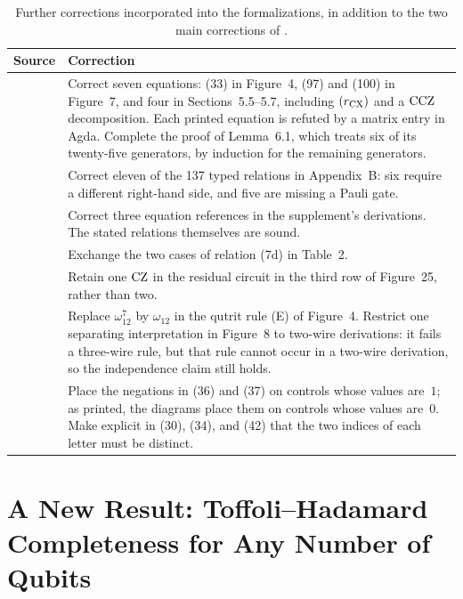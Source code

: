 \documentclass[acmsmall,screen,nonacm]{acmart}
\begin{document}
\begin{table}[!htbp]
\small
\setlength{\tabcolsep}{4pt}
\renewcommand{\arraystretch}{1.25}
\begin{tabularx}{\linewidth}{@{}l Y@{}}
\toprule
Source & Correction \\
\midrule
{} & Correct seven equations: (33) in Figure~4, (97) and (100) in Figure~7, and four in Sections~5.5--5.7, including $(r_{\mathrm{CX}})$ and a $\mathrm{CCZ}$ decomposition. Each printed equation is refuted by a matrix entry in Agda. Complete the proof of Lemma~6.1, which treats six of its twenty-five generators, by induction for the remaining generators. \\
 & Correct eleven of the 137 typed relations in Appendix~B: six require a different right-hand side, and five are missing a Pauli gate. \\
 & Correct three equation references in the supplement's derivations. The stated relations themselves are sound. \\
 & Exchange the two cases of relation (7d) in Table~2. \\
 & Retain one $\mathrm{CZ}$ in the residual circuit in the third row of Figure~25, rather than two. \\
 & Replace $\omega_{12}^7$ by $\omega_{12}$ in the qutrit rule (E) of Figure~4. Restrict one separating interpretation in Figure~8 to two-wire derivations: it fails a three-wire rule, but that rule cannot occur in a two-wire derivation, so the independence claim still holds. \\
 & Place the negations in (36) and (37) on controls whose values are~$1$; as printed, the diagrams place them on controls whose values are~$0$. Make explicit in (30), (34), and (42) that the two indices of each letter must be distinct. \\
\bottomrule
\end{tabularx}
\caption{Further corrections incorporated into the formalizations,
in addition to the two main corrections of .}
\label{tab:errata}
\end{table}

\iffalse
\section{A New Result: Toffoli–Hadamard Completeness for Any Number of Qubits}
\label{sec:toffoli-hadamard}
\end{document}
